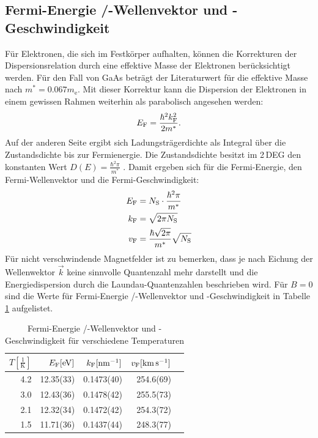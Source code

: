 \documentclass[paper=a4,fontsize=10pt,DIV=18,twocolumn,parskip=half]{scrartcl}
\numberwithin{equation}{section}    %
\begin{document}
\subsection{Fermi-Energie /-Wellenvektor und -Geschwindigkeit}
\label{a5}
Für Elektronen, die sich im Festkörper aufhalten, können die Korrekturen der Dispersionsrelation durch eine effektive Masse der Elektronen berücksichtigt werden. Für den Fall von GaAs beträgt der Literaturwert für die effektive Masse nach \cite{saarland} $m^*=0.067 m_\mathrm{e}$. Mit dieser Korrektur kann die Dispersion der Elektronen in einem gewissen Rahmen weiterhin als parabolisch angesehen werden:
\begin{equation}
E_{\rm F}=\frac{\hbar^2 k_{\rm F}^2}{2 m^*}.
\end{equation}
Auf der anderen Seite ergibt sich Ladungsträgerdichte als Integral über die Zustandsdichte bis zur Fermienergie. Die Zustandsdichte besitzt im 2\,DEG den konstanten Wert $D(E)=\frac{\hbar^2 \pi}{m^*}$ \citep{anleitung}.
Damit ergeben sich für die Fermi-Energie, den Fermi-Wellenvektor und die Fermi-Geschwindigkeit:
\begin{align}
E_{\rm F}&=N_\mathrm{S} \cdot \frac{\hbar^2 \pi}{m^*}\\
k_{\rm F}&=\sqrt{2 \pi N_\mathrm{S}}\\
v_{\rm F}&=\frac{\hbar\sqrt{2 \pi}}{m^*} \sqrt{N_\mathrm{S}}
\end{align}
Für nicht verschwindende Magnetfelder ist zu bemerken, dass je nach Eichung der Wellenwektor $\vec{k}$ keine sinnvolle Quantenzahl mehr darstellt und die Energiedispersion durch die Laundau-Quantenzahlen beschrieben wird.
Für $B=0$ sind die Werte für Fermi-Energie /-Wellenvektor und -Geschwindigkeit in Tabelle \ref{fermitabelle} aufgelistet.

\begin{table}[htp]
	\begin{center}
		\begin{tabular}{rrrrr}
			\hline
			$T[\frac{1}{\mathrm{K}}]$ & $E_{\rm F}[\mathrm{eV}]$ & $k_{\rm F}[\SI{}{\per\nano\meter}]$ & $v_{\rm F}[\SI{}{\kilo\meter\per\second}]$\\
			\hline
			4.2 &12.35(33)	&0.1473(40)&	254.6(69)\\
			3.0 &12.43(36)	&0.1478(42)&	255.5(73)\\
			2.1 &12.32(34)	&0.1472(42)&	254.3(72)\\
			1.5 &11.71(36)	&0.1437(44)&	248.3(77)\\
			\hline
		\end{tabular}
		\caption{Fermi-Energie /-Wellenvektor und -Geschwindigkeit für verschiedene Temperaturen}
		\label{fermitabelle}
	\end{center}
\end{table}
%
~~~~~~~~~~~~~~~~~~~~~~~~~~~~~~~~~~~~~~~~~~~~~~~~~~~~~~~~~~~~~~~~~~~~~~~~~~~~~
\end{document}
